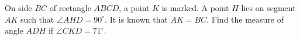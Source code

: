 On side $BC$ of rectangle $ABCD$, a point $K$ is marked. A point $H$ lies on segment $AK$ such that $\angle AHD=90^{\circ}$. It is known that $AK=BC$. Find the measure of angle $ADH$ if $\angle CKD=71^{\circ}$.

